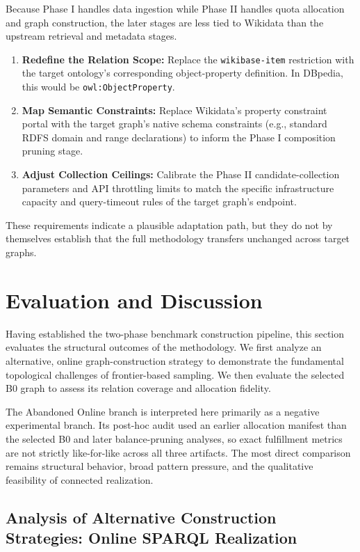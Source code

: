 \documentclass[12pt,a4paper]{article}
\begin{document}
Because Phase I handles data ingestion while Phase II handles quota allocation and graph construction, the later stages are less tied to Wikidata than the upstream retrieval and metadata stages.
\begin{enumerate}
    \item \textbf{Redefine the Relation Scope:} Replace the \texttt{wikibase-item} restriction with the target ontology's corresponding object-property definition. In DBpedia, this would be \texttt{owl:ObjectProperty}.
    \item \textbf{Map Semantic Constraints:} Replace Wikidata's property constraint portal with the target graph's native schema constraints (e.g., standard RDFS domain and range declarations) to inform the Phase I composition pruning stage.
    \item \textbf{Adjust Collection Ceilings:} Calibrate the Phase II candidate-collection parameters and API throttling limits to match the specific infrastructure capacity and query-timeout rules of the target graph's endpoint.
\end{enumerate}
These requirements indicate a plausible adaptation path, but they do not by themselves establish that the full methodology transfers unchanged across target graphs.

\section{Evaluation and Discussion}
\label{sec:evaluation_discussion}

Having established the two-phase benchmark construction pipeline, this section evaluates the structural outcomes of the methodology. We first analyze an alternative, online graph-construction strategy to demonstrate the fundamental topological challenges of frontier-based sampling. We then evaluate the selected B0 graph to assess its relation coverage and allocation fidelity.

The Abandoned Online branch is interpreted here primarily as a negative experimental branch. Its post-hoc audit used an earlier allocation manifest than the selected B0 and later balance-pruning analyses, so exact fulfillment metrics are not strictly like-for-like across all three artifacts. The most direct comparison remains structural behavior, broad pattern pressure, and the qualitative feasibility of connected realization.

\subsection{Analysis of Alternative Construction Strategies: Online SPARQL Realization}
\label{sec:abandoned-allocation}
\end{document}
